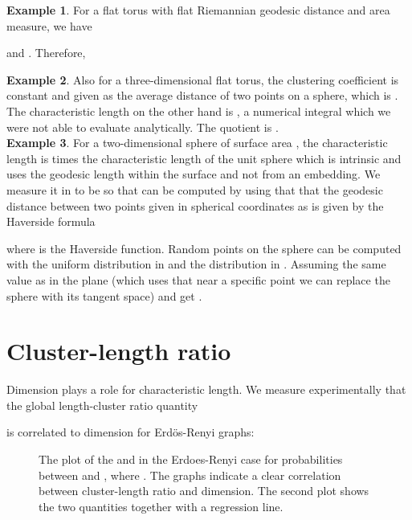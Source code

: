 \documentclass[12pt]{amsart}
\theoremstyle{definition}
\begin{document}
{\bf Example 1}. For a flat torus  with flat Riemannian geodesic 
distance and area measure, we have 

and . Therefore,


{\bf Example 2}. Also for a three-dimensional flat torus, the clustering 
coefficient  is constant and given as the average distance of two points 
on a sphere, which is . The characteristic length on the other hand is ,
a numerical integral which we were not able to evaluate analytically. The
quotient is . \\

{\bf Example 3}. For a two-dimensional sphere of surface area ,
the characteristic length  is  times the characteristic
length  of the unit sphere which is intrinsic and
uses the geodesic length within the surface and not from an embedding. 
We measure it in  to be  so that  can be computed 
by using that that the geodesic distance between
two points given in spherical coordinates as  is given by the Haverside formula

where  is the Haverside function. Random 
points on the sphere can be computed with the uniform distribution in 
and the  distribution in . Assuming the same  value as in the plane 
(which uses that near a specific point we can replace the sphere with its
tangent space) and get . 

\section{Cluster-length ratio}

Dimension plays a role for characteristic length. 
We measure experimentally that the global length-cluster ratio quantity 

is correlated to dimension for Erd\"os-Renyi graphs: 

\begin{figure}
\caption{
The plot of the  and  in the Erdoes-Renyi case
for probabilities  between  and , where . The graphs 
indicate a clear correlation between cluster-length ratio and dimension. 
The second plot shows the two quantities together with a regression line. }
\end{figure}
\end{document}
